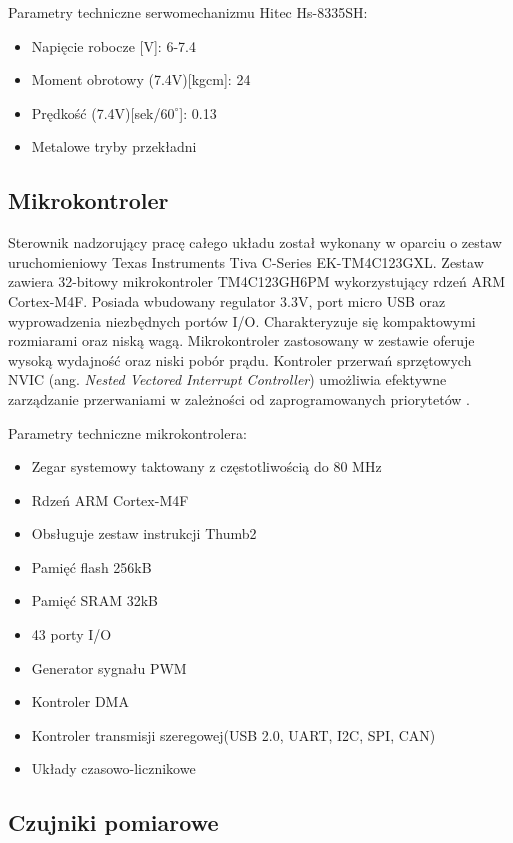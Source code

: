 Parametry techniczne serwomechanizmu Hitec Hs-8335SH:
\begin{itemize}
\item
Napięcie robocze [V]: 6-7.4
\item
Moment obrotowy (7.4V)[kgcm]: 24
\item
Prędkość (7.4V)[sek/$60^{\circ}$]: 0.13
\item
Metalowe tryby przekładni
\end{itemize} 
\label{serwo}
\subsection{Mikrokontroler}
Sterownik nadzorujący pracę całego układu został wykonany w oparciu o zestaw uruchomieniowy Texas Instruments Tiva C-Series EK-TM4C123GXL. Zestaw zawiera 32-bitowy mikrokontroler TM4C123GH6PM wykorzystujący rdzeń ARM Cortex-M4F. Posiada wbudowany regulator 3.3V, port micro USB oraz wyprowadzenia niezbędnych portów I/O. Charakteryzuje się kompaktowymi rozmiarami oraz niską wagą. Mikrokontroler zastosowany w zestawie 	oferuje wysoką wydajność oraz niski pobór prądu. Kontroler przerwań sprzętowych NVIC (ang. {\em Nested Vectored Interrupt Controller}) umożliwia efektywne zarządzanie przerwaniami w zależności od zaprogramowanych priorytetów \cite{tiva}.

Parametry techniczne mikrokontrolera:
\begin{itemize}
\item
Zegar systemowy taktowany z częstotliwością do 80 MHz
\item
Rdzeń ARM Cortex-M4F
\item 
Obsługuje zestaw instrukcji Thumb2
\item
Pamięć flash 256kB
\item
Pamięć SRAM 32kB
\item
43 porty I/O
\item
Generator sygnału PWM
\item
Kontroler DMA
\item
Kontroler transmisji szeregowej(USB 2.0, UART, I2C, SPI, CAN)
\item
Układy czasowo-licznikowe
\end{itemize} 
\subsection{Czujniki pomiarowe}
